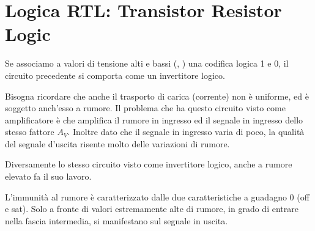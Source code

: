 \documentclass[../template]{subfiles}
\begin{document}
\section{Logica RTL: Transistor Resistor Logic}
Se associamo a valori di tensione alti e bassi (, ) una codifica logica 1 e 0, il circuito precedente si comporta come un invertitore
logico.

Bisogna ricordare che anche il trasporto di carica (corrente) non è uniforme, ed è soggetto anch'esso a rumore.
Il problema che ha questo circuito visto come amplificatore è che amplifica il rumore in ingresso ed il segnale in ingresso dello stesso
fattore $A_V$.
Inoltre dato che il segnale in ingresso varia di poco, la qualità del segnale d'uscita risente molto delle variazioni di rumore.

Diversamente lo stesso circuito visto come invertitore logico, anche a rumore elevato fa il suo lavoro.

L'immunità al rumore è caratterizzato dalle due caratteristiche a guadagno 0 (off e sat). Solo a fronte di valori estremamente alte di rumore, in
grado di entrare nella fascia intermedia, si manifestano sul segnale in uscita.

\def\vilmax{\ensuremath{{\V{IL}}_\text{MAX}}}
\def\vihmin{\ensuremath{{\V{IH}}_\text{MIN}}}
\def\nm{\ensuremath{{N}_\text{M}}}
\end{document}
